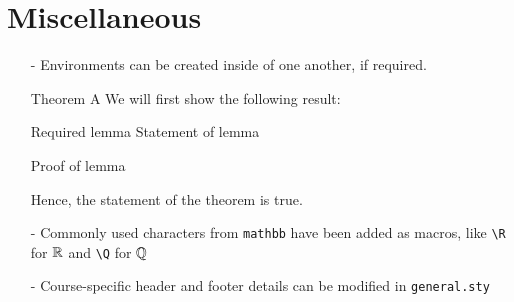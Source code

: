 \documentclass[a4paper,12pt]{article}
\begin{document}
\section{Miscellaneous}
\begin{itemize}
    \item[-] Environments can be created inside of one another, if required.
    \begin{theorem}{Theorem A}{}
        We will first show the following result:
        \begin{lemma}{Required lemma}{}
            Statement of lemma
        \end{lemma}
        \begin{lproof*}{}{}
            Proof of lemma
        \end{lproof*}
        Hence, the statement of the theorem is true.
    \end{theorem}

    \item[-] Commonly used characters from \verb|mathbb| have been added as macros, like \verb|\R| for $\mathbb{R}$ and \verb|\Q| for $\mathbb{Q}$
    
    \item[-] Course-specific header and footer details can be modified in \verb|general.sty|
\end{itemize}
\end{document}
